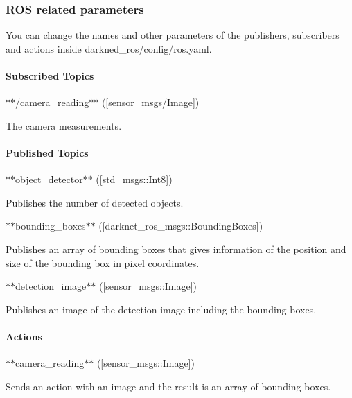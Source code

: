 \subsubsection*{R\+OS related parameters}

You can change the names and other parameters of the publishers, subscribers and actions inside {\ttfamily darkned\+\_\+ros/config/ros.\+yaml}.

\paragraph*{Subscribed Topics}


\begin{DoxyItemize}
\item $\ast$$\ast${\ttfamily /camera\+\_\+reading}$\ast$$\ast$ (\mbox{[}sensor\+\_\+msgs/\+Image\mbox{]})

The camera measurements.
\end{DoxyItemize}

\paragraph*{Published Topics}


\begin{DoxyItemize}
\item $\ast$$\ast${\ttfamily object\+\_\+detector}$\ast$$\ast$ (\mbox{[}std\+\_\+msgs\+::\+Int8\mbox{]})

Publishes the number of detected objects.
\item $\ast$$\ast${\ttfamily bounding\+\_\+boxes}$\ast$$\ast$ (\mbox{[}darknet\+\_\+ros\+\_\+msgs\+::\+Bounding\+Boxes\mbox{]})

Publishes an array of bounding boxes that gives information of the position and size of the bounding box in pixel coordinates.
\item $\ast$$\ast${\ttfamily detection\+\_\+image}$\ast$$\ast$ (\mbox{[}sensor\+\_\+msgs\+::\+Image\mbox{]})

Publishes an image of the detection image including the bounding boxes.
\end{DoxyItemize}

\paragraph*{Actions}


\begin{DoxyItemize}
\item $\ast$$\ast${\ttfamily camera\+\_\+reading}$\ast$$\ast$ (\mbox{[}sensor\+\_\+msgs\+::\+Image\mbox{]})

Sends an action with an image and the result is an array of bounding boxes.
\end{DoxyItemize}


